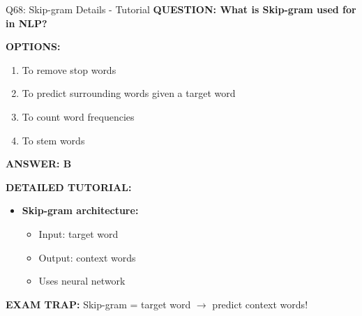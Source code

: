 \documentclass[8pt]{beamer}
\begin{document}
	\begin{frame}{Q68: Skip-gram Details - Tutorial}
		\fontsize{6.5}{7.5}\selectfont
		\textbf{QUESTION: What is Skip-gram used for in NLP?}
		
		\vspace{0.1cm}
		\textbf{OPTIONS:}
		\begin{enumerate}
			\item To remove stop words
			\item To predict surrounding words given a target word
			\item To count word frequencies
			\item To stem words
		\end{enumerate}
		
		\vspace{0.1cm}
		\textcolor{myblue}{\textbf{ANSWER: B}}
		
		\vspace{0.1cm}
		\textbf{DETAILED TUTORIAL:}
		\begin{itemize}
			\item \textbf{Skip-gram architecture:}
			\begin{itemize}
				\item Input: target word
				\item Output: context words
				\item Uses neural network
			\end{itemize}
		\end{itemize}
		
		\textcolor{myred}{\textbf{EXAM TRAP:}} Skip-gram = \textcolor{myblue}{target word $\to$ predict context words}!
	\end{frame}
	
\end{document}
